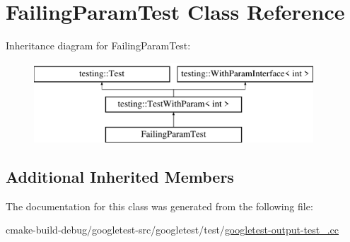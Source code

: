 \hypertarget{classFailingParamTest}{}\section{Failing\+Param\+Test Class Reference}
\label{classFailingParamTest}
Inheritance diagram for Failing\+Param\+Test\+:\begin{figure}[H]
\begin{center}
\leavevmode
\includegraphics[height=3.000000cm]{classFailingParamTest}
\end{center}
\end{figure}
\subsection*{Additional Inherited Members}


The documentation for this class was generated from the following file\+:\begin{DoxyCompactItemize}
\item 
cmake-\/build-\/debug/googletest-\/src/googletest/test/\mbox{\hyperlink{googletest-output-test___8cc}{googletest-\/output-\/test\+\_\+.\+cc}}\end{DoxyCompactItemize}
